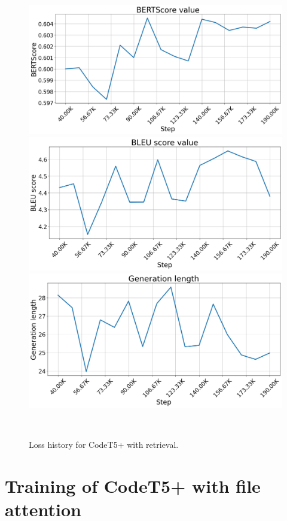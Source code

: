 \begin{figure}[H]
    \centering
    \includegraphics[scale=0.3]{figs/retrieval_BERTScore.png}
    \includegraphics[scale=0.3]{figs/retrieval_BLEU score.png}
    \includegraphics[scale=0.3]{figs/retrieval_Generation length.png}
    \caption{Loss history for CodeT5+ with retrieval.}
    ~\label{fig:retrieval_interim_metrics}
\end{figure}

\section{Training of CodeT5+ with file attention}

